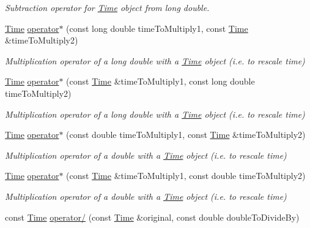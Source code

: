 \begin{DoxyCompactItemize}
\begin{DoxyCompactList}\small\item\em Subtraction operator for \hyperlink{classtudat_1_1Time}{Time} object from long double. \end{DoxyCompactList}\item 
\hyperlink{classtudat_1_1Time}{Time} \hyperlink{classtudat_1_1Time_a6839a759ce0dc453d0c7ec4fcc64f0c5}{operator$\ast$} (const long double time\+To\+Multiply1, const \hyperlink{classtudat_1_1Time}{Time} \&time\+To\+Multiply2)
\begin{DoxyCompactList}\small\item\em Multiplication operator of a long double with a \hyperlink{classtudat_1_1Time}{Time} object (i.\+e. to rescale time) \end{DoxyCompactList}\item 
\hyperlink{classtudat_1_1Time}{Time} \hyperlink{classtudat_1_1Time_afb70b5fc1353e811708613de2fe6de89}{operator$\ast$} (const \hyperlink{classtudat_1_1Time}{Time} \&time\+To\+Multiply1, const long double time\+To\+Multiply2)
\begin{DoxyCompactList}\small\item\em Multiplication operator of a long double with a \hyperlink{classtudat_1_1Time}{Time} object (i.\+e. to rescale time) \end{DoxyCompactList}\item 
\hyperlink{classtudat_1_1Time}{Time} \hyperlink{classtudat_1_1Time_a1957d457097d1513441d737c66175b5d}{operator$\ast$} (const double time\+To\+Multiply1, const \hyperlink{classtudat_1_1Time}{Time} \&time\+To\+Multiply2)
\begin{DoxyCompactList}\small\item\em Multiplication operator of a double with a \hyperlink{classtudat_1_1Time}{Time} object (i.\+e. to rescale time) \end{DoxyCompactList}\item 
\hyperlink{classtudat_1_1Time}{Time} \hyperlink{classtudat_1_1Time_a5ffc1c1d9c3ba8ad28cde5e1346946fb}{operator$\ast$} (const \hyperlink{classtudat_1_1Time}{Time} \&time\+To\+Multiply1, const double time\+To\+Multiply2)
\begin{DoxyCompactList}\small\item\em Multiplication operator of a double with a \hyperlink{classtudat_1_1Time}{Time} object (i.\+e. to rescale time) \end{DoxyCompactList}\item 
const \hyperlink{classtudat_1_1Time}{Time} \hyperlink{classtudat_1_1Time_a8e86a3cf7414d283552450a04bca61a8}{operator/} (const \hyperlink{classtudat_1_1Time}{Time} \&original, const double double\+To\+Divide\+By)

\end{DoxyCompactItemize}
